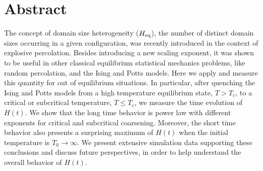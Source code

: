 \chapter*{Abstract}
 
The concept of domain size heterogeneity ($H_{\scriptsize\rm eq}$), the number of distinct domain sizes occurring in a given configuration, was recently introduced in the context of explosive percolation. Besides introducing a new scaling exponent, it was shown to be useful in other classical equilibrium statistical mechanics problems, like random percolation, and the Ising and Potts models. Here we apply and measure this quantity for out of equilibrium situations. In particular, after quenching the Ising and Potts models from a high temperature equilibrium state, $T>T_c$, to a critical or subcritical temperature, $T\leq T_c$, we measure the time evolution of $H(t)$. We show that the long time behavior is power law with different exponents for critical and subcritical coarsening. Moreover, the short time behavior also presents a surprising maximum of $H(t)$ when the initial temperature is $T_0\to\infty$. We present extensive simulation data supporting these conclusions and discuss future perspectives, in order to help understand the overall behavior of $H(t)$.

